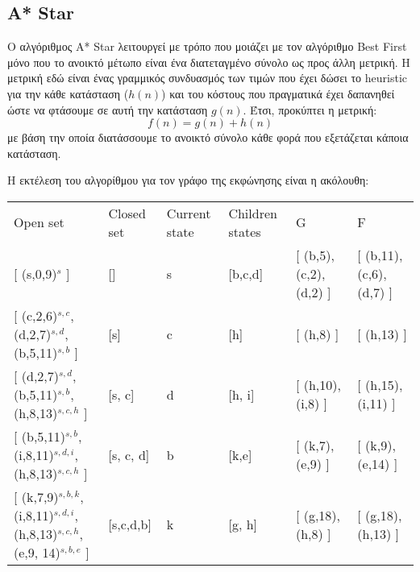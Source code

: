 \documentclass[a4paper,oneside, 11pt]{article}
\begin{document}
\subsection*{A* Star}
Ο αλγόριθμος A* Star λειτουργεί με τρόπο που μοιάζει με τον αλγόριθμο Best First μόνο που το ανοικτό μέτωπο είναι ένα διατεταγμένο σύνολο ως προς άλλη μετρική. Η μετρική εδώ είναι ένας γραμμικός συνδυασμός των τιμών που έχει δώσει το heuristic για την κάθε κατάσταση ($h(n)$) και του κόστους που πραγματικά έχει δαπανηθεί ώστε να φτάσουμε σε αυτή την κατάσταση $g(n)$. Έτσι, προκύπτει η μετρική:
$$f(n) = g(n) + h(n)$$ 
με βάση την οποία διατάσσουμε το ανοικτό σύνολο κάθε φορά που εξετάζεται κάποια κατάσταση.

Η εκτέλεση του αλγορίθμου για τον γράφο της εκφώνησης είναι η ακόλουθη: \bigbreak
\begin{adjustbox}{width=\textwidth,center=\textwidth}
\begin{tabular}{llllll}
	\cline{1-6}
	\multicolumn{1}{|l|}{Open set}                   & \multicolumn{1}{l|}{Closed set} & \multicolumn{1}{l|}{Current state} & \multicolumn{1}{l|}{Children states} & \multicolumn{1}{l|}{G}      & \multicolumn{1}{l|}{F}                            \\ \cline{1-6}
	{[} (s,0,9)$^s$ {]}                                  & {[}{]}                          & s                                  & {[}b,c,d{]}                          & {[} (b,5), (c,2), (d,2) {]} & {[} (b,11), (c,6), (d,7) {]} \\
	{[} (c,2,6)$^{s,c}$, (d,2,7)$^{s,d}$, (b,5,11)$^{s,b}$ {]}               & {[}s{]}                         & c                                  & {[}h{]}                              & {[} (h,8) {]}               & {[} (h,13) {]}               \\
	{[} (d,2,7)$^{s,d}$, (b,5,11)$^{s,b}$, (h,8,13)$^{s,c,h}$ {]}              & {[}s, c{]}                      & d                                  & {[}h, i{]}                           & {[} (h,10), (i,8) {]}       & {[} (h,15), (i,11) {]}       \\
	{[} (b,5,11)$^{s,b}$, (i,8,11)$^{s,d,i}$, (h,8,13)$^{s,c,h}$ {]}             & {[}s, c, d{]}                   & b                                  & {[}k,e{]}                            & {[} (k,7), (e,9) {]}        & {[} (k,9), (e,14) {]}        \\
	{[} (k,7,9)$^{s,b,k}$, (i,8,11)$^{s,d,i}$, (h,8,13)$^{s,c,h}$, (e,9, 14)$^{s,b,e}$ {]}   & {[}s,c,d,b{]}                   & k                                  & {[}g, h{]}                              & {[} (g,18), (h,8) {]}              & {[} (g,18), (h,13) {]}               \\

\end{tabular}
\end{adjustbox}
\end{document}
